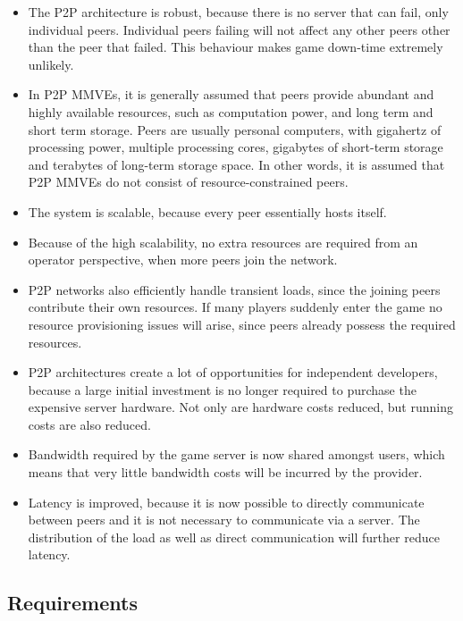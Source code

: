 \begin{itemize}
\item The P2P architecture is robust, because there is no server that can fail, only individual peers. Individual peers failing will not affect any other peers other than the peer that failed. This behaviour makes game down-time extremely unlikely.

\item In P2P MMVEs, it is generally assumed that peers provide abundant and highly available resources, such as computation power, and long term and short term storage. Peers are usually personal computers, with gigahertz of processing power, multiple processing cores, gigabytes of short-term storage and terabytes of long-term storage space. In other words, it is assumed that P2P MMVEs do not consist of resource-constrained peers.

\item The system is scalable, because every peer essentially hosts itself.

\item Because of the high scalability, no extra resources are required from an operator perspective, when more peers join the network.

\item P2P networks also efficiently handle transient loads, since the joining peers contribute their own resources. If many players suddenly enter the
game no resource provisioning issues will arise, since peers already possess the required resources.

\item P2P architectures create a lot of opportunities for independent developers, because a large initial investment is no longer required to purchase
the expensive server hardware. Not only are hardware costs reduced, but running costs are also reduced.

\item Bandwidth required by the game server is now shared amongst users, which means that very little bandwidth costs will be incurred by the provider.

\item Latency is improved, because it is now possible to directly communicate between peers and it is not necessary to communicate via a server.
The distribution of the load as well as direct communication will further reduce latency.
\end{itemize}

\subsection{Requirements}

